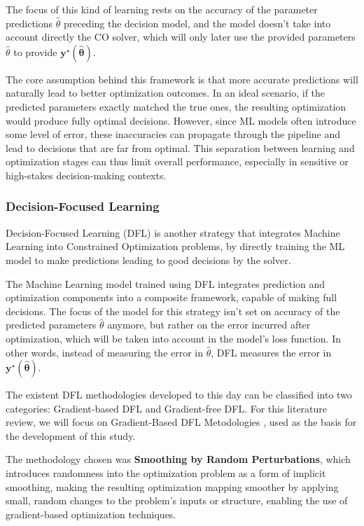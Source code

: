 The focus of this kind of learning rests on the accuracy of the parameter predictions \(\hat{\theta}\) preceding the decision model, and the model doesn't take into account directly the CO solver, which will only later use the provided parameters \(\hat{\theta}\) to provide \(\mathbf{y}^\star(\mathbf{\hat{\theta}})\).

The core assumption behind this framework is that more accurate predictions will naturally lead to better optimization outcomes. In an ideal scenario, if the predicted parameters exactly matched the true ones, the resulting optimization would produce fully optimal decisions. However, since ML models often introduce some level of error, these inaccuracies can propagate through the pipeline and lead to decisions that are far from optimal. This separation between learning and optimization stages can thus limit overall performance, especially in sensitive or high-stakes decision-making contexts.

\subsubsection{Decision-Focused Learning}

Decision-Focused Learning (DFL) is another strategy that integrates Machine Learning into Constrained Optimization problems, by directly training the ML model to make predictions leading to good decisions by the solver.

The Machine Learning model trained using DFL integrates prediction and optimization components into a composite framework, capable of making full decisions. The focus of the model for this strategy isn't set on accuracy of the predicted parameters \(\hat{\theta}\) anymore, but rather on the error incurred after optimization, which will be taken into account in the model's loss function. In other words, instead of measuring the error in \(\hat{\theta}\), DFL measures the error in \(\mathbf{y}^\star(\mathbf{\hat{\theta}})\).

The existent DFL methodologies developed to this day can be classified into two categories: Gradient-based DFL and Gradient-free DFL. For this literature review, we will focus on Gradient-Based DFL Metodologies \cite{mandiDecisionFocusedLearningFoundations2024}, used as the basis for the development of this study. 

The methodology chosen was \textbf{Smoothing by Random Perturbations}, which introduces randomness into the optimization problem as a form of implicit smoothing, making the resulting optimization mapping smoother by applying small, random changes to the problem’s inputs or structure, enabling the use of gradient-based optimization techniques. 

